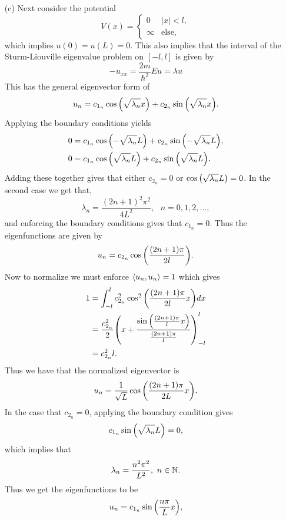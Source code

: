 \documentclass[12pt]{report}
\begin{document}
\begin{solution}
\begin{enumerate}
        \item [(c)]
        Next consider the potential
        \[ 
            V(x) = \begin{cases}
                0 &|x| < l,\\
                \infty &\text{else},
            \end{cases}
        \]
        which implies $u(0) = u(L) = 0$. This also implies that the interval of the Sturm-Liouville eigenvalue problem on $[-l, l]$ is given by
        \[ 
            -u_{xx} = \frac{2m}{\hbar^2}Eu = \lambda u
        \] 
        This has the general eigenvector form of
        \[
            u_n = c_{1_n} \cos {\left(\sqrt{\lambda_n}x\right)} + c_{2_n} \sin {\left(\sqrt{\lambda_n}x\right)}.
        \]
        Applying the boundary conditions yields
        \begin{align*}
            0 &= c_{1_n} \cos {\left(-\sqrt{\lambda_n}L\right)} + c_{2_n} \sin {\left(-\sqrt{\lambda_n}L\right)},\\
            0 &= c_{1_n} \cos {\left(\sqrt{\lambda_n}L\right)} + c_{2_n} \sin {\left(\sqrt{\lambda_n}L\right)}.
        \end{align*}
        Adding these together gives that either $c_{2_n} = 0$ or $\cos{\left(\sqrt{\lambda_n}L\right)} = 0$. In the second case we get that,
        \[ 
            \lambda_n = \frac{(2n + 1)^2\pi^2}{4L^2}, ~~~ n=0,1,2,\dots,
        \] 
        and enforcing the boundary conditions gives that $c_{1_n} = 0$. Thus the eigenfunctions are given by
        \[ 
            u_n = c_{2_n} \cos{\left(\frac{(2n + 1)\pi}{2l}\right)}.
        \]
        Now to normalize we must enforce ${\left\langle u_n,u_n\right\rangle} = 1$ which gives
        \begin{align*}
            1 &= \int_{-l}^l c_{2_n}^2 \cos^2{\left(\frac{(2n + 1)\pi}{2l} x\right)}dx\\
            &= \frac{c_{2_n}^2}{2} {\left(x + \frac{\sin{\left(\frac{(2n + 1)\pi}{l}x\right)}}{\frac{(2n + 1)\pi}{l}}\right)}_{-l}^{l}\\
            &= c_{2_n}^2l.
        \end{align*} 
        Thus we have that the normalized eigenvector is
        \[ 
            u_n = \frac{1}{\sqrt{L}} \cos{\left(\frac{(2n + 1)\pi}{2L}x\right)}.
        \] 
        In the case that $c_{2_n} = 0$, applying the boundary condition gives
        \[ 
            c_{1_n}\sin{\left(\sqrt{\lambda_n}L\right)} = 0,
        \]
        which implies that
        \[ 
            \lambda_n = \frac{n^2\pi^2}{L^2}, ~ n \in {\mathbb N}.
        \]
        Thus we get the eigenfunctions to be
        \[ 
            u_n = c_{1_n}\sin{\left(\frac{n\pi}{L}x\right)},
\]
\end{enumerate}
\end{solution}
\end{document}
